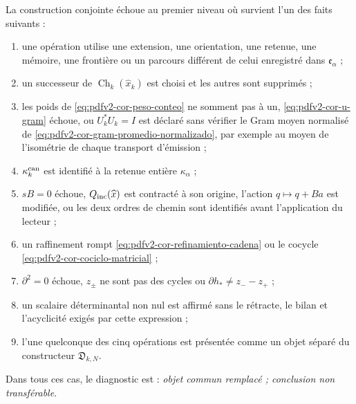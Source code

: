 \begin{criterion}
\label{crit:pdfv2-cor-falsadores}
La construction conjointe échoue au premier niveau où survient l'un des faits suivants :
\begin{enumerate}
 \item une opération utilise une extension, une orientation, une retenue, une mémoire, une frontière ou un parcours différent de celui enregistré dans \(\mathfrak e_\alpha\) ;
 \item un successeur de \(\operatorname{Ch}_k(\widehat x_k)\) est choisi et les autres sont supprimés ;
 \item les poids de \eqref{eq:pdfv2-cor-peso-conteo} ne somment pas à un, \eqref{eq:pdfv2-cor-u-gram} échoue, ou \(U_k^*U_k=I\) est déclaré sans vérifier le Gram moyen normalisé de \eqref{eq:pdfv2-cor-gram-promedio-normalizado}, par exemple au moyen de l'isométrie de chaque transport d'émission ;
 \item \(\kappa_k^{\rm can}\) est identifié à la retenue entière \(\kappa_\alpha\) ;
 \item \(sB=0\) échoue, \(Q_{\rm inc}(\widehat x)\) est contracté à son origine, l'action \(q\mapsto q+Ba\) est modifiée, ou les deux ordres de chemin sont identifiés avant l'application du lecteur ;
 \item un raffinement rompt \eqref{eq:pdfv2-cor-refinamiento-cadena} ou le cocycle \eqref{eq:pdfv2-cor-cociclo-matricial} ;
 \item \(\partial^2=0\) échoue, \(z_\pm\) ne sont pas des cycles ou \(\partial h_*\neq z_--z_+\) ;
 \item un scalaire déterminantal non nul est affirmé sans le rétracte, le bilan et l'acyclicité exigés par cette expression ;
 \item l'une quelconque des cinq opérations est présentée comme un objet séparé du constructeur \(\mathfrak D_{k,N}\).
\end{enumerate}
Dans tous ces cas, le diagnostic est : \emph{objet commun remplacé ; conclusion non transférable}.
\end{criterion}
